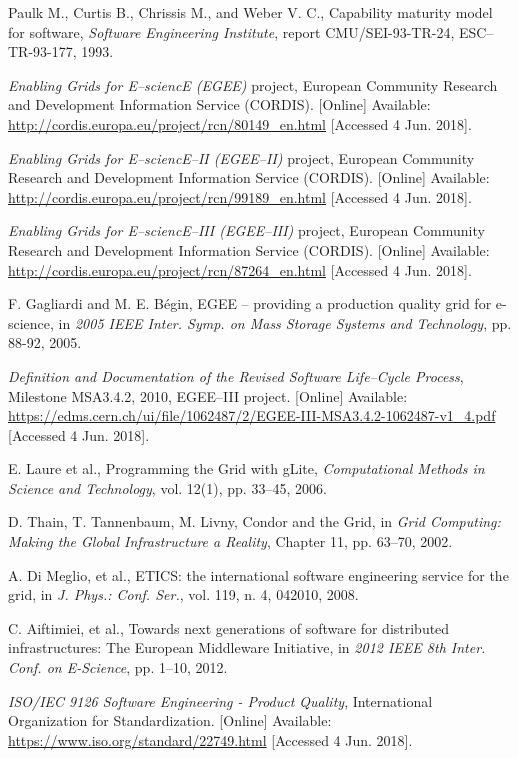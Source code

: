 \documentclass[journal]{IEEEtran}
\begin{document}
\begin{thebibliography}{1}
Paulk M., Curtis B., Chrissis M., and Weber V. C.,
Capability maturity model for software,
\emph{Software Engineering Institute},
report CMU/SEI-93-TR-24, ESC--TR-93-177, 1993.

\emph{Enabling Grids for E--sciencE (EGEE)} project, European Community Research and
Development Information Service (CORDIS).
[Online] Available: \url{http://cordis.europa.eu/project/rcn/80149\_en.html}
[Accessed 4 Jun. 2018].

\emph{Enabling Grids for E--sciencE--II (EGEE--II)} project, European Community Research and
Development Information Service (CORDIS).
[Online] Available: \url{http://cordis.europa.eu/project/rcn/99189\_en.html}
[Accessed 4 Jun. 2018].

\emph{Enabling Grids for E--sciencE--III (EGEE--III)} project, European Community
Research and Development Information Service (CORDIS).
[Online] Available: \url{http://cordis.europa.eu/project/rcn/87264\_en.html}
[Accessed 4 Jun. 2018].

F. Gagliardi and M. E. B\'{e}gin,
EGEE -- providing a production quality grid for e-science,
in \emph{2005 IEEE Inter. Symp. on Mass Storage Systems and Technology},
pp. 88-92, 2005.

\emph{Definition and Documentation of the Revised Software Life--Cycle Process},
Milestone MSA3.4.2, 2010, EGEE--III project.
[Online] Available: \url{https://edms.cern.ch/ui/file/1062487/2/EGEE-III-MSA3.4.2-1062487-v1_4.pdf}
[Accessed 4 Jun. 2018].

E. Laure et al.,
Programming the Grid with gLite,
\emph{Computational Methods in Science and Technology},
vol. 12(1), pp. 33--45, 2006.

D. Thain, T. Tannenbaum, M. Livny,
Condor and the Grid,
in \emph{Grid Computing: Making the Global Infrastructure a Reality},
Chapter 11, pp. 63--70, 2002.

A. Di Meglio, et al.,
ETICS: the international software engineering service for the grid,
in \emph{J. Phys.: Conf. Ser.},
vol. 119, n. 4, 042010, 2008.

C. Aiftimiei, et al.,
Towards next generations of software for distributed infrastructures: The European Middleware Initiative,
in \emph{2012 IEEE 8th Inter. Conf. on E-Science},
pp. 1--10, 2012.

\emph{ISO/IEC 9126 Software Engineering - Product Quality},
International Organization for Standardization.
[Online] Available: \url{https://www.iso.org/standard/22749.html}
[Accessed 4 Jun. 2018].


\end{thebibliography}
\end{document}
